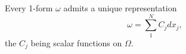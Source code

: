 
Every 1-form $\omega$ admits a unique representation
$$\omega = \sum_{1}^{N} C_j dx_j,$$
the $C_j$ being scalar functions on $\Omega$.
